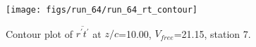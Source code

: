\begin{figure}[H]
\centering
\texttt{[image: figs/run\_64/run\_64\_rt\_contour]}
\caption{Contour plot of $\overline{r^\prime t^\prime}$ at $z/c$=10.00, $V_{free}$=21.15, station 7.}
\end{figure}


